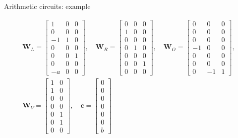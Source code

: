 \documentclass{zkdl-presentation-template}
\begin{document}
\begin{frame}{Arithmetic circuits: example}
    \begin{example}
    \begin{align*}
    \mathbf{W}_L = \begin{bmatrix}
        1 & 0 & 0 \\
        0 & 0 & 0 \\
        -1 & 1 & 0 \\
        0 & 0 & 0 \\
        0 & 0 & 1 \\
        0 & 0 & 0 \\
        -a & 0 & 0
    \end{bmatrix},\quad
    \mathbf{W}_R = \begin{bmatrix}
        0 & 0 & 0 \\
        1 & 0 & 0 \\
        0 & 0 & 0 \\
        0 & 1 & 0 \\
        0 & 0 & 0 \\
        0 & 0 & 1 \\
        0 & 0 & 0
    \end{bmatrix},\quad
    \mathbf{W}_O = \begin{bmatrix}
        0 & 0 & 0 \\
        0 & 0 & 0 \\
        0 & 0 & 0 \\
        -1 & 0 & 0 \\
        0 & 0 & 0 \\
        0 & 0 & 0 \\
        0 & -1 & 1
    \end{bmatrix},\\
    \mathbf{W}_V = \begin{bmatrix}
        1 & 0 \\
        1 & 0 \\
        0 & 0 \\
        0 & 0 \\
        0 & 1 \\
        0 & 1 \\
        0 & 0
    \end{bmatrix},\quad
    \mathbf{c} = \begin{bmatrix}
        0 \\ 0 \\ 0 \\ 0 \\ 0 \\ 0 \\ b
    \end{bmatrix}
    \end{align*}
    \end{example}
\end{frame}
\end{document}
